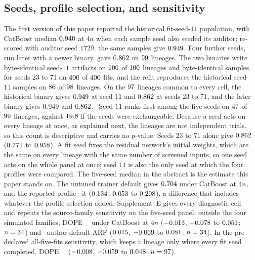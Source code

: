 \documentclass{article} %
\begin{document}
\subsection{Seeds, profile selection, and sensitivity}
\label{sec:seeds}
The first version of this paper reported the historical fit-seed-$11$ population, with CatBoost median $0.940$ at $4n$ when each sample seed also seeded its auditor; re-scored with auditor seed $1729$, the same samples give $0.949$. Four further seeds, run later with a newer binary, gave $0.862$ on $99$ lineages. The two binaries write byte-identical seed-$11$ artifacts on $100$ of $100$ lineages and byte-identical samples for seeds $23$ to $71$ on $400$ of $400$ fits, and the refit reproduces the historical seed-$11$ samples on $86$ of $98$ lineages. On the $97$ lineages common to every cell, the historical binary gives $0.949$ at seed $11$ and $0.862$ at seeds $23$ to $71$, and the later binary gives $0.949$ and $0.862$. \VBinarySentence\ Seed $11$ ranks first among the five seeds on $47$ of $99$ lineages, against $19.8$ if the seeds were exchangeable. Because a seed acts on every lineage at once, as explained next, the lineages are not independent trials, so this count is descriptive and carries no $p$-value. Seeds $23$ to $71$ alone give $0.862$ ($0.771$ to $0.958$). A fit seed fixes the residual network's initial weights, which are the same on every lineage with the same number of screened inputs, so one seed acts on the whole panel at once; seed $11$ is also the only seed at which the four profiles were compared. The five-seed median in the abstract is the estimate this paper stands on. The untuned trainer default gives $0.704$ under CatBoost at $4n$, and the reported profile \VVerdictDopeDefCbFour\ it ($0.134$, $0.053$ to $0.208$), a difference that includes whatever the profile selection added. Supplement~E gives every diagnostic cell and repeats the source-family sensitivity on the five-seed panel: outside the four simulated families, DOPE \VExclStrongVerdict\ \VStrongestName\ under CatBoost at $4n$ ($-0.013$, $-0.078$ to $0.051$; $n=34$) and \VExclArfCbFourVerdict\ author-default ARF ($0.015$, $-0.069$ to $0.081$; $n=34$). In the pre-declared all-five-fits sensitivity, which keeps a lineage only where every fit seed completed, DOPE \VAllFiveStrongVerdict\ \VStrongestName\ ($-0.008$, $-0.059$ to $0.048$; $n=97$).
\end{document}
